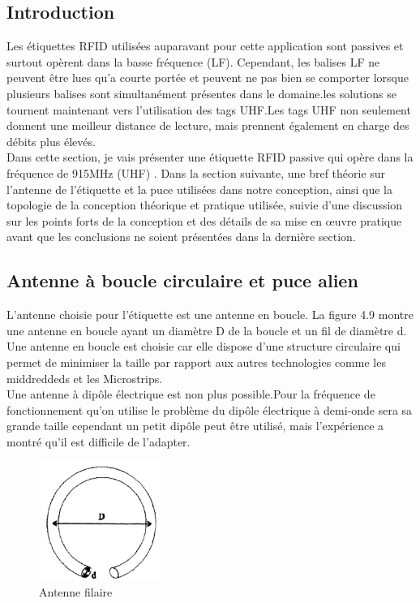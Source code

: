 \documentclass[11pt, a4paper, twoside]{book}
\begin{document}
\subsection{Introduction}
Les étiquettes RFID utilisées auparavant pour cette application sont passives et surtout opèrent dans la basse fréquence (LF). Cependant, les balises LF ne peuvent être lues qu'a courte portée et peuvent ne pas bien se comporter lorsque plusieurs balises sont simultanément présentes dans le domaine.les solutions se tournent maintenant vers l'utilisation des tags UHF.Les tags UHF non seulement donnent une meilleur distance de lecture, mais prennent également en charge des débits plus élevés. \\

Dans cette section, je vais présenter  une étiquette RFID passive qui opère dans la fréquence de 915MHz (UHF) . Dans la section suivante, une bref  théorie  sur l'antenne de l'étiquette et la puce utilisées dans notre conception, ainsi que la topologie de la conception théorique et pratique utilisée, suivie d'une discussion sur les points forts de la conception et des détails de sa mise en œuvre pratique avant que les conclusions ne soient présentées dans la dernière section.
\subsection{Antenne à boucle circulaire et puce alien}
L'antenne choisie pour l'étiquette  est une antenne en boucle. La figure 4.9 montre une antenne en boucle ayant un diamètre D de la boucle et un fil de diamètre d. Une antenne en boucle est choisie car elle dispose d'une structure circulaire qui permet de minimiser la taille par rapport aux autres technologies comme les middreddeds et les Microstrips.\\

Une antenne à dipôle électrique est non plus possible.Pour la fréquence de fonctionnement qu'on utilise le problème du dipôle électrique à demi-onde sera sa grande taille cependant un petit dipôle peut être utilisé, mais l'expérience a montré qu'il est difficile de l'adapter.
\begin{figure}[H]
\centering
\includegraphics[width=4cm]{cla}
\caption{Antenne filaire}
\end{figure}
\end{document}
